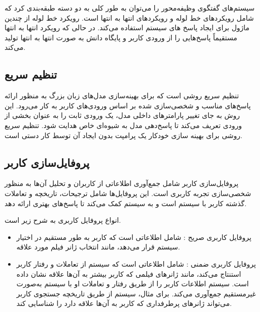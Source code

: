سیستم‌های گفتگوی وظیفه‌محور را می‌توان به طور کلی به دو دسته طبقه‌بندی کرد که شامل رویکردهای 
خط لوله
 و رویکردهای 
انتها به انتها
 است. رویکرد خط لوله از چندین ماژول برای ایجاد پاسخ های سیستم استفاده می‌کند. در حالی که رویکرد انتها به انتها مستقیماً پاسخ‌هایی را از ورودی کاربر و 
پایگاه دانش
 به صورت انتها به انتها تولید می‌کند.%
\cite{chung2023instructtods}

\subsection{تنظیم سریع}
 تنظیم سریع%
 روشی است که برای بهینه‌سازی مدل‌های زبان بزرگ به منظور ارائه پاسخ‌های مناسب و شخصی‌سازی شده بر اساس ورودی‌های کاربر به کار می‌رود. این روش به جای تغییر پارامترهای داخلی مدل، یک ورودی%
 ثابت را به عنوان بخشی از ورودی تعریف می‌کند تا پاسخ‌دهی مدل به شیوه‌ای خاص هدایت شود. تنظیم سریع روشی برای بهینه سازی خودکار یک پرامپت بدون ایجاد آن توسط کار دستی است.%
\cite{kasahara2022building}


\subsection{پروفایل‌سازی کاربر}

پروفایل‌سازی کاربر%
 شامل جمع‌آوری اطلاعاتی از کاربران و تحلیل آن‌ها به منظور شخصی‌سازی تجربه کاربری است. این پروفایل‌ها شامل ترجیحات، تاریخچه و تعاملات گذشته کاربر با سیستم است و به سیستم کمک می‌کند تا پاسخ‌های بهتری ارائه دهد.

انواع پروفایل کاربری به شرح زیر است.
\begin{itemize}
\item
پروفایل کاربری صریح%
: شامل اطلاعاتی است که کاربر به طور مستقیم در اختیار سیستم قرار می‌دهد، مانند انتخاب ژانر فیلم مورد علاقه.
\item
پروفایل کاربری ضمنی%
: شامل اطلاعاتی است که سیستم از تعاملات و رفتار کاربر استنتاج می‌کند، مانند ژانرهای فیلمی که کاربر بیشتر به آن‌ها علاقه نشان داده است. سیستم اطلاعات کاربر را از طریق رفتار و تعاملات او با سیستم به‌صورت غیرمستقیم جمع‌آوری می‌کند. برای مثال، سیستم از طریق تاریخچه جستجوی کاربر می‌تواند ژانرهای پرطرفداری که کاربر به آن‌ها علاقه دارد را شناسایی کند.
\end{itemize}

